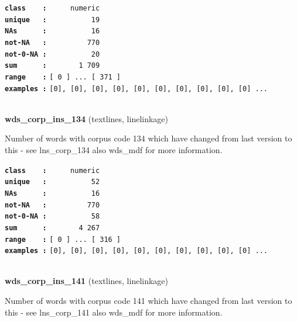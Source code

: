 \documentclass[]{article}
\begin{document}
\textbf{\texttt{class\ \ \ \ :}} \texttt{~~~~~numeric}\\
\textbf{\texttt{unique\ \ \ :}} \texttt{~~~~~~~~~~19}\\
\textbf{\texttt{NAs\ \ \ \ \ \ :}} \texttt{~~~~~~~~~~16}\\
\textbf{\texttt{not-NA\ \ \ :}} \texttt{~~~~~~~~~770}\\
\textbf{\texttt{not-0-NA\ :}} \texttt{~~~~~~~~~~20}\\
\textbf{\texttt{sum\ \ \ \ \ \ :}} \texttt{~~~~~~~1~709}\\
\textbf{\texttt{range\ \ \ \ :}}
\texttt{{[}\ 0\ {]}\ ...\ {[}\ 371\ {]}}\\
\textbf{\texttt{examples\ :}}
\texttt{{[}0{]},\ {[}0{]},\ {[}0{]},\ {[}0{]},\ {[}0{]},\ {[}0{]},\ {[}0{]},\ {[}0{]},\ {[}0{]},\ {[}0{]}\ ...}\\

~

\textbf{wds\_corp\_ins\_134} (textlines, linelinkage)

Number of words with corpus code 134 which have changed from last
version to this - see lns\_corp\_134 also wds\_mdf for more information.

\textbf{\texttt{class\ \ \ \ :}} \texttt{~~~~~numeric}\\
\textbf{\texttt{unique\ \ \ :}} \texttt{~~~~~~~~~~52}\\
\textbf{\texttt{NAs\ \ \ \ \ \ :}} \texttt{~~~~~~~~~~16}\\
\textbf{\texttt{not-NA\ \ \ :}} \texttt{~~~~~~~~~770}\\
\textbf{\texttt{not-0-NA\ :}} \texttt{~~~~~~~~~~58}\\
\textbf{\texttt{sum\ \ \ \ \ \ :}} \texttt{~~~~~~~4~267}\\
\textbf{\texttt{range\ \ \ \ :}}
\texttt{{[}\ 0\ {]}\ ...\ {[}\ 316\ {]}}\\
\textbf{\texttt{examples\ :}}
\texttt{{[}0{]},\ {[}0{]},\ {[}0{]},\ {[}0{]},\ {[}0{]},\ {[}0{]},\ {[}0{]},\ {[}0{]},\ {[}0{]},\ {[}0{]}\ ...}\\

~

\textbf{wds\_corp\_ins\_141} (textlines, linelinkage)

Number of words with corpus code 141 which have changed from last
version to this - see lns\_corp\_141 also wds\_mdf for more information.
\end{document}
